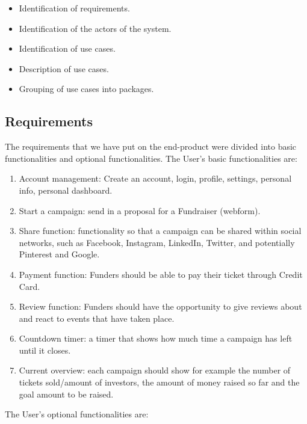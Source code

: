 \begin{itemize}\addtolength{\itemsep}{-0.35\baselineskip}   
      \item 
      Identification of requirements.
      \item 
      Identification of the actors of the system.
      \item 
      Identification of use cases.
      \item 
      Description of use cases.
      \item 
      Grouping of use cases into packages.
\end{itemize}


\subsection{Requirements}
The requirements that we have put on the end-product were divided into basic functionalities and optional functionalities.
The User’s basic functionalities are:
\begin{enumerate}
    \item
          Account management: Create an account, login, profile, settings, personal info,
          personal dashboard.
    \item
          Start a campaign: send in a proposal for a Fundraiser (webform).
    \item
          Share function: functionality so that a campaign can be shared within social networks, such as Facebook, Instagram, LinkedIn, Twitter, and potentially Pinterest and Google.
    
    \item
          Payment function: Funders should be able to pay their ticket through Credit Card.
    \item
          Review function: Funders should have the opportunity to give reviews about and react to events
          that have taken place.
    \item
          Countdown timer: a timer that shows how much time a campaign has left until it closes.
    \item
          Current overview: each campaign should show for example the number of tickets sold/amount of investors, the amount of money raised so far and the goal amount to be raised.
\end{enumerate}


The User’s optional functionalities are:

